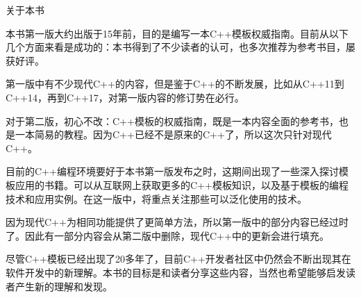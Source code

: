 \begin{flushright}
 关于本书
\end{flushright}

本书第一版大约出版于15年前，目的是编写一本C++模板权威指南。目前从以下几个方面来看是成功的：本书得到了不少读者的认可，也多次推荐为参考书目，屡获好评。

第一版中有不少现代C++的内容，但是鉴于C++的不断发展，比如从C++11到C++14，再到C++17，对第一版内容的修订势在必行。

对于第二版，初心不改：C++模板的权威指南，既是一本内容全面的参考书，也是一本简易的教程。因为C++已经不是原来的C++了，所以这次只针对现代C++。

目前的C++编程环境要好于本书第一版发布之时，这期间出现了一些深入探讨模板应用的书籍。可以从互联网上获取更多的C++模板知识，以及基于模板的编程技术和应用实例。在这一版中，将重点关注那些可以泛化使用的技术。

因为现代C++为相同功能提供了更简单方法，所以第一版中的部分内容已经过时了。因此有一部分内容会从第二版中删除，现代C++中的更新会进行填充。

尽管C++模板已经出现了20多年了，目前C++开发者社区中仍然会不断出现其在软件开发中的新理解。本书的目标是和读者分享这些内容，当然也希望能够启发读者产生新的理解和发现。